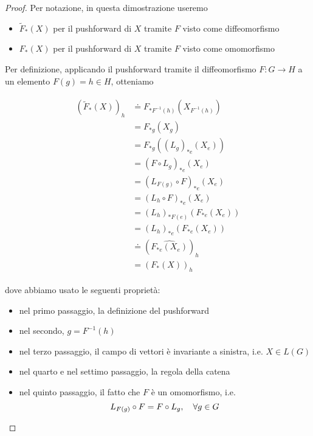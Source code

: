 \begin{proof}
	Per notazione, in questa dimostrazione useremo
	
	\begin{itemize}
		\item $ \tilde{F}_{*}(X) $ per il pushforward di $ X $ tramite $ F $ visto come diffeomorfismo
		
		\item $ F_{*}(X) $ per il pushforward di $ X $ tramite $ F $ visto come omomorfismo
	\end{itemize}

	Per definizione, applicando il pushforward tramite il diffeomorfismo $ F : G \to H $ a un elemento $ F(g) = h \in H $, otteniamo
	
	\begin{align}
		\begin{split}
			(\tilde{F}_{*}(X))_{h} &\doteq F_{*F^{-1}(h)}(X_{F^{-1}(h)}) \\
			&= F_{*g}(X_{g}) \\
			&= F_{*g}((L_{g})_{*e}(X_{e})) \\
			&= (F \circ L_{g})_{*e} (X_{e}) \\
			&= (L_{F(g)} \circ F)_{*e} (X_{e}) \\
			&= (L_{h} \circ F)_{*e} (X_{e}) \\
			&= (L_{h})_{*F(e)} (F_{*e}(X_{e})) \\
			&= (L_{h})_{*e} (F_{*e}(X_{e})) \\
			&\doteq (\widehat{ F_{*e}(X_{e}) })_{h} \\
			&= (F_{*}(X))_{h}
		\end{split}
	\end{align}

	dove abbiamo usato le seguenti proprietà:
	
	\begin{itemize}
		\item nel primo passaggio, la definizione del pushforward
		
		\item nel secondo, $ g = F^{-1}(h) $
		
		\item nel terzo passaggio, il campo di vettori è invariante a sinistra, i.e. $ X \in L(G) $
		
		\item nel quarto e nel settimo passaggio, la regola della catena
		
		\item nel quinto passaggio, il fatto che $ F $ è un omomorfismo, i.e.
		\begin{equation}
			L_{F(g)} \circ F = F \circ L_{g} \qcomma \forall g \in G
		\end{equation}		
		

\end{itemize}
\end{proof}
